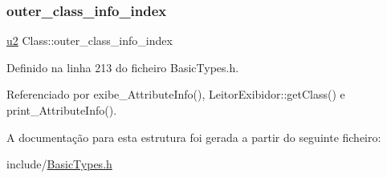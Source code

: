 \subsubsection{\texorpdfstring{outer\+\_\+class\+\_\+info\+\_\+index}{outer\_class\_info\_index}}
{\footnotesize\ttfamily \hyperlink{BasicTypes_8h_a732cde1300aafb73b0ea6c2558a7a54f}{u2} Class\+::outer\+\_\+class\+\_\+info\+\_\+index}



Definido na linha 213 do ficheiro Basic\+Types.\+h.



Referenciado por exibe\+\_\+\+Attribute\+Info(), Leitor\+Exibidor\+::get\+Class() e print\+\_\+\+Attribute\+Info().



A documentação para esta estrutura foi gerada a partir do seguinte ficheiro\+:\begin{DoxyCompactItemize}
\item 
include/\hyperlink{BasicTypes_8h}{Basic\+Types.\+h}\end{DoxyCompactItemize}
